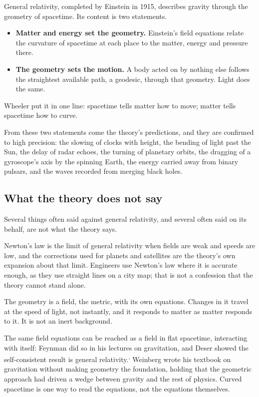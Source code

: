 General relativity, completed by Einstein in 1915, describes gravity through the geometry of spacetime. Its content is two statements.
\begin{itemize}
\item \textbf{Matter and energy set the geometry.} Einstein's field equations relate the curvature of spacetime at each place to the matter, energy and pressure there.
\item \textbf{The geometry sets the motion.} A body acted on by nothing else follows the straightest available path, a geodesic, through that geometry. Light does the same.
\end{itemize}
Wheeler put it in one line: spacetime tells matter how to move; matter tells spacetime how to curve.

From these two statements come the theory's predictions, and they are confirmed to high precision: the slowing of clocks with height, the bending of light past the Sun, the delay of radar echoes, the turning of planetary orbits, the dragging of a gyroscope's axis by the spinning Earth, the energy carried away from binary pulsars, and the waves recorded from merging black holes.

\subsection{What the theory does not say}

Several things often said against general relativity, and several often said on its behalf, are not what the theory says.

 Newton's law is the limit of general relativity when fields are weak and speeds are low, and the corrections used for planets and satellites are the theory's own expansion about that limit. Engineers use Newton's law where it is accurate enough, as they use straight lines on a city map; that is not a confession that the theory cannot stand alone.

 The geometry is a field, the metric, with its own equations. Changes in it travel at the speed of light, not instantly, and it responds to matter as matter responds to it. It is not an inert background.

 The same field equations can be reached as a field in flat spacetime, interacting with itself: Feynman did so in his lectures on gravitation, and Deser showed the self-consistent result is general relativity.\textsuperscript{,} Weinberg wrote his textbook on gravitation without making geometry the foundation, holding that the geometric approach had driven a wedge between gravity and the rest of physics. Curved spacetime is one way to read the equations, not the equations themselves.


